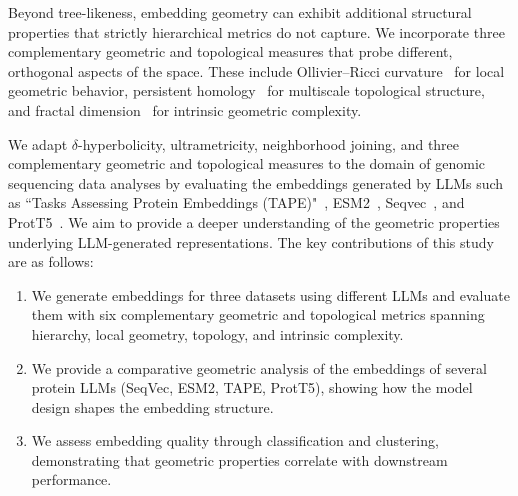 \documentclass[]{Liebert_Author_revised}
\begin{document}
Beyond tree-likeness, embedding geometry can exhibit additional structural properties that strictly hierarchical metrics do not capture. We incorporate three complementary geometric and topological measures that probe different, orthogonal aspects of the space. These include Ollivier–Ricci curvature~\citeauthor{ollivier2009ricci, ni2015ricci} for local geometric behavior, persistent homology~\citeauthor{edelsbrunner2008persistent} for multiscale topological structure, and fractal dimension~\citeauthor{grassberger1983measuring} for intrinsic geometric complexity. 

We adapt $\delta$-hyperbolicity, ultrametricity, neighborhood joining, and three complementary geometric and topological measures to the domain of genomic sequencing data analyses by evaluating the embeddings generated by LLMs such as ``Tasks Assessing Protein Embeddings (TAPE)"~\citeauthor{rao2019evaluating}, ESM2~\citeauthor{lin2023evolutionary}, Seqvec~\citeauthor{heinzinger2019modeling}, and ProtT5~\citeauthor{elnaggar2021prottrans}. We aim to provide a deeper understanding of the geometric properties underlying LLM-generated representations.
The key contributions of this study are as follows:
\begin{enumerate}
\item We generate embeddings for three datasets using different LLMs and evaluate them with six complementary geometric and topological metrics spanning hierarchy, local geometry, topology, and intrinsic complexity.
\item We provide a comparative geometric analysis of the embeddings of several protein LLMs (SeqVec, ESM2, TAPE, ProtT5), showing how the model design shapes the embedding structure.
\item We assess embedding quality through classification and clustering, demonstrating that geometric properties correlate with downstream performance.
\end{enumerate}
\end{document}
